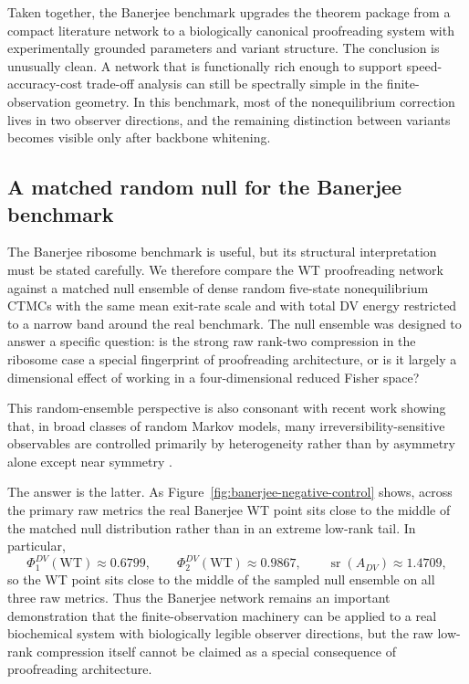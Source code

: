 \documentclass[11pt,a4paper]{article}
\numberwithin{equation}{section}
\theoremstyle{thmcompact}
\theoremstyle{remark}
\begin{document}
Taken together, the Banerjee benchmark upgrades the theorem package from a compact literature network to a biologically canonical proofreading system with experimentally grounded parameters and variant structure. The conclusion is unusually clean. A network that is functionally rich enough to support speed-accuracy-cost trade-off analysis can still be spectrally simple in the finite-observation geometry. In this benchmark, most of the nonequilibrium correction lives in two observer directions, and the remaining distinction between variants becomes visible only after backbone whitening.

\subsection{A matched random null for the Banerjee benchmark}

The Banerjee ribosome benchmark is useful, but its structural interpretation must be stated carefully. We therefore compare the WT proofreading network against a matched null ensemble of dense random five-state nonequilibrium CTMCs with the same mean exit-rate scale and with total DV energy restricted to a narrow band around the real benchmark. The null ensemble was designed to answer a specific question: is the strong raw rank-two compression in the ribosome case a special fingerprint of proofreading architecture, or is it largely a dimensional effect of working in a four-dimensional reduced Fisher space?

This random-ensemble perspective is also consonant with recent work showing that, in broad classes of random Markov models, many irreversibility-sensitive observables are controlled primarily by heterogeneity rather than by asymmetry alone except near symmetry \cite{MosamDeGiuli2026}.

The answer is the latter. As Figure~\ref{fig:banerjee-negative-control} shows, across the primary raw metrics the real Banerjee WT point sits close to the middle of the matched null distribution rather than in an extreme low-rank tail. In particular,
\begin{equation}
\Phi^{DV}_{1}(\mathrm{WT})\approx 0.6799,
\qquad
\Phi^{DV}_{2}(\mathrm{WT})\approx 0.9867,
\qquad
\operatorname{sr}(A_{DV})\approx 1.4709,
\end{equation}
so the WT point sits close to the middle of the sampled null ensemble on all three raw metrics. Thus the Banerjee network remains an important demonstration that the finite-observation machinery can be applied to a real biochemical system with biologically legible observer directions, but the raw low-rank compression itself cannot be claimed as a special consequence of proofreading architecture.
\end{document}
